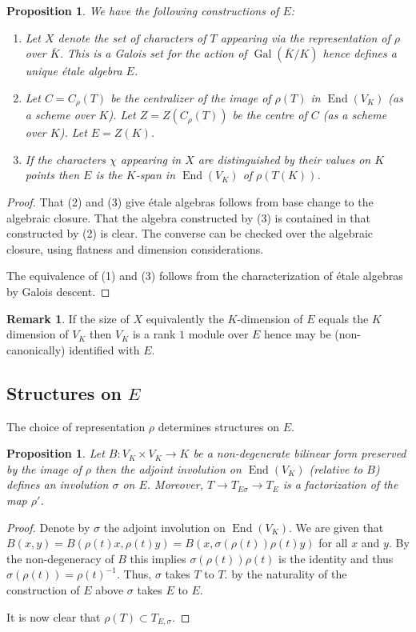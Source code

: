 \documentclass{article}
\theoremstyle{plain}
\newtheorem{proposition}[theorem]{Proposition}
\theoremstyle{definition}
\newtheorem{remark}[theorem]{Remark}
\DeclareMathOperator{\Gal}{Gal}
\DeclareMathOperator{\End}{End}
\begin{document}
\begin{proposition}
We have the following constructions of $E$:
\begin{enumerate}
\item Let $X$ denote the set of characters of $T$ appearing via the representation of $\rho$ over $\overline{K}$. This is a Galois set for the action of $\Gal(\overline{K}/K)$ hence defines a unique \'etale algebra $E$.
\item Let $C = C_\rho(T)$ be the centralizer of the image of $\rho(T)$ in $\End(V_K)$ (as a scheme over $K$).
           Let $Z = Z(C_\rho(T))$ be the centre of $C$ (as a scheme over $K$).
           Let $E = Z(K)$.
\item If the characters $\chi$ appearing in $X$ are distinguished by their values on $K$ points then $E$ is the $K$-span in $\End(V_K)$ of $\rho(T(K))$.
\end{enumerate}
\end{proposition}
\begin{proof}
That (2) and (3) give \'etale algebras follows from base change to the algebraic closure.
That the algebra constructed by (3) is contained in that constructed by (2) is clear.
The converse can be checked over the algebraic closure, using flatness and dimension considerations.

The equivalence of (1) and (3) follows from the characterization of \'etale algebras by Galois descent.
\end{proof}

\begin{remark}
If the size of $X$ equivalently the $K$-dimension of $E$ equals the $K$ dimension of $V_K$ then $V_K$ is a rank $1$ module over $E$ hence may be (non-canonically) identified with $E$.
\end{remark}

\subsection{Structures on $E$}

The choice of representation $\rho$ determines structures on $E$.

\begin{proposition}
Let $B : V_K \times V_K \rightarrow K$ be a non-degenerate bilinear form preserved by the image of $\rho$ then the adjoint involution on $\End(V_K)$ (relative to $B$) defines an involution $\sigma$ on $E$.
Moreover, $T \rightarrow T_{E\sigma} \rightarrow T_E$ is a factorization of the map $\rho'$.
\end{proposition}
\begin{proof}
Denote by $\sigma$ the adjoint involution on $\End(V_K)$.
We are given that $B(x,y) = B(\rho(t)x,\rho(t)y) = B(x,\sigma(\rho(t))\rho(t)y)$ for all $x$ and $y$. By the non-degeneracy of $B$ this implies $\sigma(\rho(t))\rho(t)$ is the identity and thus $\sigma(\rho(t)) = \rho(t)^{-1}$. Thus, $\sigma$ takes $T$ to $T$. by the naturality of the construction of $E$ above $\sigma$ takes $E$ to $E$.

It is now clear that $\rho(T) \subset T_{E,\sigma}$.
\end{proof}
\end{document}
